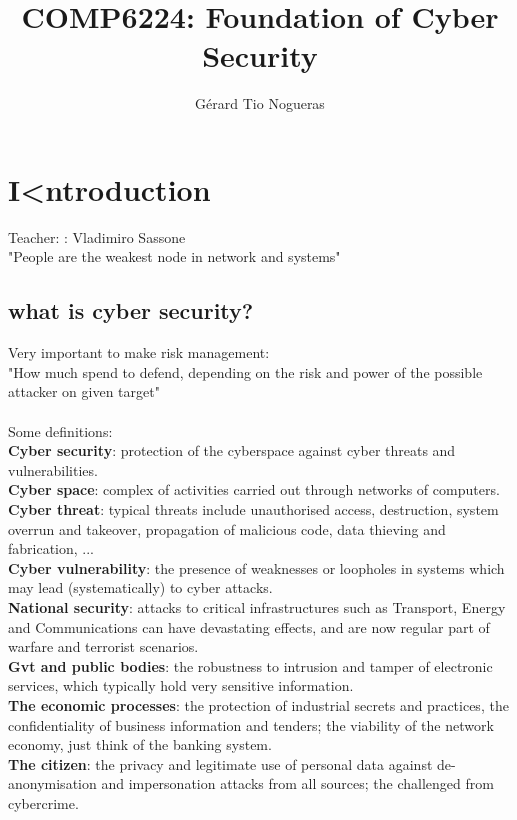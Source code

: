 \documentclass[10pt,a4paper]{article}
\author{Gérard Tio Nogueras}
\title{COMP6224: Foundation of Cyber Security}
\begin{document}
\maketitle
\newpage
\tableofcontents
\newpage
\section{I<ntroduction}
Teacher: : Vladimiro Sassone\\
"People are the weakest node in network and systems"
\subsection{what is cyber security?}
Very important to make risk management:\\
"How much spend to defend, depending on the risk and power of the possible attacker on given target"\\ \\
Some definitions:\\
\textbf{Cyber security}: protection of the cyberspace against cyber threats and vulnerabilities.\\
\textbf{Cyber space}: complex of activities carried out through networks of computers.\\
\textbf{Cyber threat}: typical threats include unauthorised access, destruction, system overrun and takeover, propagation of malicious code, data thieving and fabrication, ...\\
\textbf{Cyber vulnerability}:  the presence of weaknesses or loopholes in systems which may lead (systematically) to cyber attacks. \\
\textbf{National security}: attacks to critical infrastructures such as Transport, Energy and  Communications can have devastating effects, and are now regular part of warfare and terrorist scenarios.\\
\textbf{Gvt and public bodies}: the robustness to intrusion and tamper of electronic services, 
which typically hold very sensitive information.\\
\textbf{The economic processes}:  the protection of industrial secrets and practices, the confidentiality of 
business information and tenders; the viability of the network economy, just think of the banking system. \\
\textbf{The citizen}: the privacy and legitimate use of personal data against de-anonymisation and 
impersonation attacks from all sources; the challenged from cybercrime.\\
\end{document}
